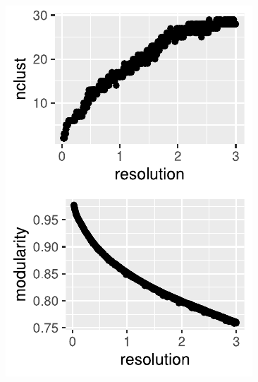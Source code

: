 \documentclass{beamer}
\begin{document}
{\begin{columns}
\begin{column}{0.50\textwidth}
			\includegraphics[width=\textwidth]{modularity.pdf}
		\end{column}
	\end{columns}
}
\end{document}
